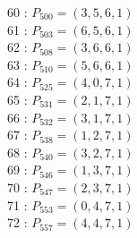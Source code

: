 \documentclass{article}
\begin{document}
{\begin{multicols}{3}
60 : $P_{500}=( 3, 5, 6, 1 )$\\
61 : $P_{503}=( 6, 5, 6, 1 )$\\
62 : $P_{508}=( 3, 6, 6, 1 )$\\
63 : $P_{510}=( 5, 6, 6, 1 )$\\
64 : $P_{525}=( 4, 0, 7, 1 )$\\
65 : $P_{531}=( 2, 1, 7, 1 )$\\
66 : $P_{532}=( 3, 1, 7, 1 )$\\
67 : $P_{538}=( 1, 2, 7, 1 )$\\
68 : $P_{540}=( 3, 2, 7, 1 )$\\
69 : $P_{546}=( 1, 3, 7, 1 )$\\
70 : $P_{547}=( 2, 3, 7, 1 )$\\
71 : $P_{553}=( 0, 4, 7, 1 )$\\
72 : $P_{557}=( 4, 4, 7, 1 )$\\
\end{multicols}


%


%


}%
\end{document}
